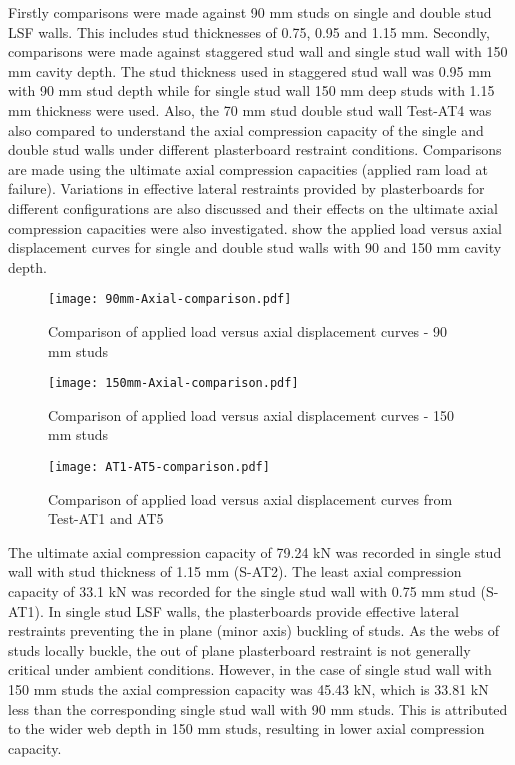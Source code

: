 Firstly comparisons were made against 90 mm studs on single and double stud LSF walls. This includes stud thicknesses of 0.75, 0.95 and 1.15 mm. Secondly, comparisons were made against staggered stud wall and single stud wall with 150 mm cavity depth. The stud thickness used in staggered stud wall was 0.95 mm with 90 mm stud depth while for single stud wall 150 mm deep studs with 1.15 mm thickness were used. Also, the 70 mm stud double stud wall Test-AT4 was also compared to understand the axial compression capacity of the single and double stud walls under different plasterboard restraint conditions. Comparisons are made using the ultimate axial compression capacities (applied ram load at failure). Variations in effective lateral restraints provided by plasterboards for different configurations are also discussed and their effects on the ultimate axial compression capacities were also investigated.  show the applied load versus axial displacement curves for single and double stud walls with 90 and 150 mm cavity depth.
\begin{figure}[!htbp]
	\centering
			\texttt{[image: 90mm-Axial-comparison.pdf]}\\
		\caption{Comparison of applied load versus axial displacement curves - 90 mm studs}
		\label{fig:90mm-comparison-ambient}
\end{figure}
\begin{figure}[!htbp]
	\centering
			\texttt{[image: 150mm-Axial-comparison.pdf]}\\
		\caption{Comparison of applied load versus axial displacement curves - 150 mm studs}
		\label{fig:150mm-comparison-ambient}
\end{figure}
\begin{figure}[!htbp]
	\centering
			\texttt{[image: AT1-AT5-comparison.pdf]}\\
		\caption{Comparison of applied load versus axial displacement curves from Test-AT1 and AT5}
		\label{fig:AT1-AT5-comparison-ambient}
\end{figure}

The ultimate axial compression capacity of 79.24 kN was recorded in single stud wall with stud thickness of 1.15 mm (S-AT2). The least axial compression capacity of 33.1 kN was recorded for the single stud wall with 0.75 mm stud (S-AT1). In single stud LSF walls, the plasterboards provide effective lateral restraints preventing the in plane (minor axis) buckling of studs. As the webs of studs locally buckle, the out of plane plasterboard restraint is not generally critical under ambient conditions. However, in the case of single stud wall with 150 mm studs the axial compression capacity was 45.43 kN, which is 33.81 kN less than the corresponding single stud wall with 90 mm studs. This is attributed to the wider web depth in 150 mm studs, resulting in lower axial compression capacity.

